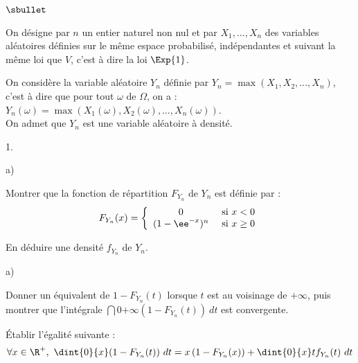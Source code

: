 \begin{noliste}{$\sbullet$}
\item On désigne par $n$ un entier naturel non nul et par $X_{1},
  \ldots, X_{n}$ des variables aléatoires définies sur le même espace
  probabilisé, indépendantes et suivant la même loi que $V$, c'est à
  dire la loi $\Exp{1}$.

\item On considère la variable aléatoire $Y_{n}$ définie par $Y_{n} =
  \max(X_{1},X_{2}, \ldots,X_{n})$, c'est à dire que pour tout
  $\omega$ de $\Omega$, on a : $Y_{n}(\omega) =
  \max(X_{1}(\omega),X_{2}(\omega), \ldots, X_n(\omega))$.\\
  On admet que $Y_{n}$ est une variable aléatoire à densité.
\end{noliste}

\begin{noliste}{1.}
  \setlength{\itemsep}{4mm} %
  \setcounter{enumi}{1}
\item
  \begin{noliste}{a)}
    \setlength{\itemsep}{2mm}
  \item Montrer que la fonction de répartition $F_{Y_{n}}$ de $Y_{n}$
    est définie par :
    \[
    F_{Y_{n}}(x) = \left\{
      \begin{array}{cl}
        0 & \hbox{ si } x<0\\
        (1-\ee^{-x})^{n} & \hbox{ si } x \geq 0
      \end{array}
    \right.
    \]
    
    

    

    
  \item En déduire une densité $f_{Y_{n}}$ de $Y_{n}$.
    
    
  \end{noliste}
  
\item
  \begin{noliste}{a)}
    \setlength{\itemsep}{2mm}
  \item Donner un équivalent de $1-F_{Y_{n}}(t)$ lorsque $t$ est au
    voisinage de $ + \infty$, puis montrer que l'intégrale $
    \dint{0}{+ \infty} \left(1-F_{Y_{n}}(t) \right) \ dt$ est
    convergente.
    
    
      
  \item Établir l'égalité suivante :
    \[
    \forall x \in \R^+, \ \dint{0}{x} (1-F_{Y_{n}}(t)) \ dt =
    x\left(1-F_{Y_{n}}(x)\right) + \dint{0}{x} t f_{Y_{n}}(t) \ dt
    \]
    

\end{noliste}
\end{noliste}
